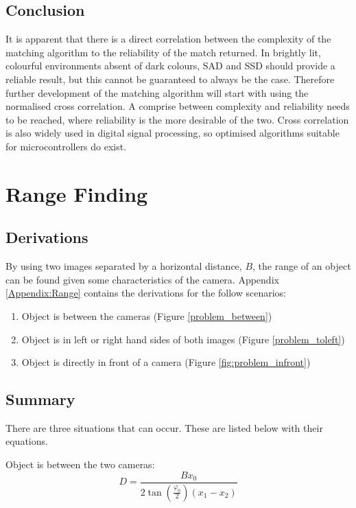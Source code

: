 \subsection{Conclusion}
It is apparent that there is a direct correlation between the complexity of the matching algorithm to the reliability of the match returned. In brightly lit, colourful environments absent of dark colours, SAD and SSD should provide a reliable result, but this cannot be guaranteed to always be the case. Therefore further development of the matching algorithm will start with using the normalised cross correlation. A comprise between complexity and reliability needs to be reached, where reliability is the more desirable of the two. Cross correlation is also widely used in digital signal processing, so optimised algorithms suitable for microcontrollers do exist.

\section{Range Finding}
\subsection{Derivations}

By using two images separated by a horizontal distance, $B$, the range of an object can be found given some characteristics of the camera. Appendix \ref{Appendix:Range} contains the derivations for the follow scenarios:

\begin{enumerate}
\item Object is between the cameras (Figure \ref{problem_between})
\item Object is in left or right hand sides of both images (Figure \ref{problem_toleft})
\item Object is directly in front of a camera (Figure \ref{fig:problem_infront})
\end{enumerate}


\subsection{Summary}
There are three situations that can occur. These are listed below with their equations.

Object is between the two cameras:
\begin{equation} \label{eq:summary:1}
D = \frac{Bx_0}{2\tan(\frac{\varphi_0}{2})(x_1 - x_2)}
\end{equation}

